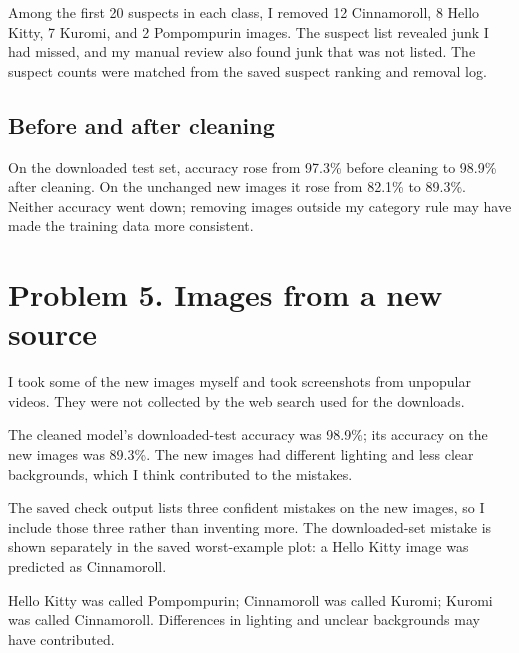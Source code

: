 \documentclass[11pt]{article}
\begin{document}
Among the first 20 suspects in each class, I removed 12 Cinnamoroll, 8 Hello
Kitty, 7 Kuromi, and 2 Pompompurin images. The suspect list revealed junk I
had missed, and my manual review also found junk that was not listed. The
suspect counts were matched from the saved suspect ranking and removal log.

\subsection*{Before and after cleaning}

On the downloaded test set, accuracy rose from 97.3\% before cleaning to
98.9\% after cleaning. On the unchanged new images it rose from 82.1\% to
89.3\%. Neither accuracy went down; removing images outside my category rule
may have made the training data more consistent.

\section*{Problem 5. Images from a new source}

I took some of the new images myself and took screenshots from unpopular
videos. They were not collected by the web search used for the downloads.


The cleaned model's downloaded-test accuracy was 98.9\%; its accuracy on the
new images was 89.3\%. The new images had different lighting and less clear
backgrounds, which I think contributed to the mistakes.

The saved check output lists three confident mistakes on the new images, so I
include those three rather than inventing more. The downloaded-set mistake is
shown separately in the saved worst-example plot: a Hello Kitty image was
predicted as Cinnamoroll.


\begin{center}
\hfill
{}\hfill
{}
\end{center}
\begin{center}
Hello Kitty was called Pompompurin; Cinnamoroll was called Kuromi;
Kuromi was called Cinnamoroll. Differences in lighting and unclear
backgrounds may have contributed.
\end{center}
\end{document}
